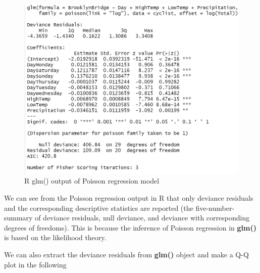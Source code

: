 \documentclass[
]{book}
\newenvironment{Shaded}{\begin{snugshade}}{\end{snugshade}}
\newcommand{\AttributeTok}[1]{\textcolor[rgb]{0.13,0.29,0.53}{#1}}
\newcommand{\DecValTok}[1]{\textcolor[rgb]{0.00,0.00,0.81}{#1}}
\newcommand{\FunctionTok}[1]{\textcolor[rgb]{0.13,0.29,0.53}{\textbf{#1}}}
\newcommand{\NormalTok}[1]{#1}
\newcommand{\OtherTok}[1]{\textcolor[rgb]{0.56,0.35,0.01}{#1}}
\newcommand{\SpecialCharTok}[1]{\textcolor[rgb]{0.81,0.36,0.00}{\textbf{#1}}}
\newcommand{\StringTok}[1]{\textcolor[rgb]{0.31,0.60,0.02}{#1}}
\begin{document}
\begin{figure}

{\centering \includegraphics[width=0.7\linewidth]{img10/w10-glmPoisOutput} 

}

\caption{R glm() output of Poisson regression model}\label{fig:unnamed-chunk-151}
\end{figure}

We can see from the Poisson regression output in R that only deviance residuals and the corresponding descriptive statistics are reported (the five-number-summary of deviance residuals, null deviance, and deviance with corresponding degrees of freedoms). This is because the inference of Poisson regression in \textbf{glm()} is based on the likelihood theory.

We can also extract the deviance residuals from \textbf{glm()} object and make a Q-Q plot in the following

\begin{Shaded}
\end{Shaded}
\end{document}
